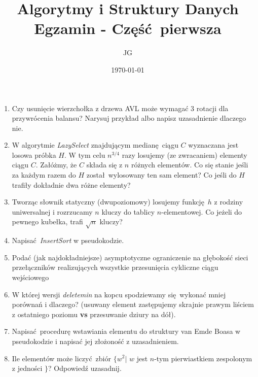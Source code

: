 \documentclass[12pt]{article}
\begin{document}
\begin{titlepage}

\title{\bfseries Algorytmy i Struktury Danych\\\Large Egzamin - Część pierwsza}
\date{\today}
\author{JG}
\end{titlepage}

\maketitle

\begin{enumerate}

    \item{Czy usunięcie wierzchołka z drzewa AVL może wymagać 3 rotacji
    dla przywrócenia balansu? Narysuj przykład albo napisz uzasadnienie
    dlaczego nie.}
    
    \item{W algorytmie \textit{LazySelect} znajdującym medianę ciągu $C$
    wyznaczana jest losowa próbka $H$. W tym celu $n^{3/4}$ razy losujemy (ze zwracaniem)
    elementy ciągu $C$. Załóżmy, że $C$ składa się z $n$ różnych elementów. Co się
    stanie jeśli za każdym razem do $H$ został wylosowany ten sam element?
    Co jeśli do $H$ trafiły dokładnie dwa różne elementy?}
    
    \item{Tworząc słownik statyczny (dwupoziomowy) losujemy funkcję $h$ z
    rodziny uniwersalnej i rozrzucamy $n$ kluczy do tablicy $n$-elementowej. Co jeżeli 
    do pewnego kubełka, trafi $\sqrt{n}$ kluczy?}
    
    \item{Napisać \textit{InsertSort} w pseudokodzie.}
    
    \item{Podać (jak najdokładniejsze) asymptotyczne ograniczenie na głębokość sieci
        przełączników realizujących wszystkie przesunięcia cykliczne ciągu wejściowego}

    \item{W której wersji \textit{deletemin} na kopcu spodziewamy się wykonać
    mniej porównań i dlaczego? (usuwany element zastępujemy skrajnie prawym liściem
    z ostatniego poziomu \textbf{vs} przesuwanie dziury na dół).}

    \item{Napisać procedurę wstawiania elementu do struktury van Emde Boasa w 
    pseudokodzie i napisać jej złożoność z uzasadnieniem.}

    \item{Ile elementów może liczyć zbiór $\{w^2 | \,\,w$ jest 
    $n$-tym pierwiastkiem zespolonym z jedności $\}$}? Odpowiedź uzasadnij.


\end{enumerate}
\end{document}

